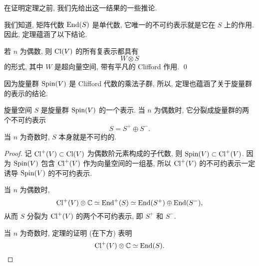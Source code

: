 在证明定理之前, 我们先给出这一结果的一些推论.

我们知道, 矩阵代数 $\operatorname{End} (S)$ 是单代数,
它唯一的不可约表示就是它在 $S$ 上的作用. 因此, 定理蕴涵了以下结论.

\begin{corollary}
    若 $n$ 为偶数, 则 $\operatorname{Cl} (V)$ 的所有复表示都具有
    \[ W \otimes S \]
    的形式, 其中 $W$ 是超向量空间, 带有平凡的 Clifford 作用. \qed
\end{corollary}

因为旋量群 $\mathrm{Spin} (V)$ 是 Clifford 代数的乘法子群,
所以, 定理也蕴涵了关于旋量群的表示的结论.

\begin{corollary}
    旋量空间 $S$ 是旋量群 $\mathrm{Spin} (V)$ 的一个表示.
    当 $n$ 为偶数时, 它分裂成旋量群的两个不可约表示
    \[ S = S^+ \oplus S^-. \]
    当 $n$ 为奇数时, $S$ 本身就是不可约的.
\end{corollary}

\begin{proof}
    记 $\operatorname{Cl}^+ (V) \subset \operatorname{Cl} (V)$ 为偶数阶元素构成的子代数, 
    则 $\mathrm{Spin} (V) \subset \operatorname{Cl}^+ (V)$.
    因为 $\mathrm{Spin} (V)$ 包含 $\operatorname{Cl}^+ (V)$ 作为向量空间的一组基,
    所以 $\operatorname{Cl}^+ (V)$ 的不可约表示一定诱导 $\mathrm{Spin} (V)$ 的不可约表示.
    
    当 $n$ 为偶数时,
    \[ \operatorname{Cl}^+ (V) \otimes \mathbb{C} \simeq \operatorname{End}^+ (S) \simeq \operatorname{End} (S^+) \oplus \operatorname{End} (S^-), \]
    从而 $S$ 分裂为 $\operatorname{Cl}^+ (V)$ 的两个不可约表示, 即 $S^+$ 和 $S^-$.
    
    当 $n$ 为奇数时, 定理的证明 (在下方) 表明
    \[ \operatorname{Cl}^+ (V) \otimes \mathbb{C} \simeq \operatorname{End} (S). \qedhere \]
\end{proof}

